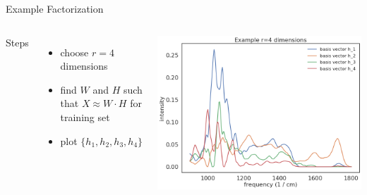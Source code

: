 \documentclass[aspectratio=169]{beamer}
\begin{document}
\begin{frame}{Example Factorization}

	\begin{columns}
			Steps
			 \begin{itemize}
				\item choose $r=4 $ dimensions
				\item find $W$ and $H$ such that $X \approx W \cdot H$ for  training set
				\item plot $\{ h_1, h_2, h_3, h_4 \} $
			\end{itemize}
		
			\includegraphics[width=\linewidth]{images/four_basis_vectors.png}
	\end{columns}
\end{frame}

\end{document}
